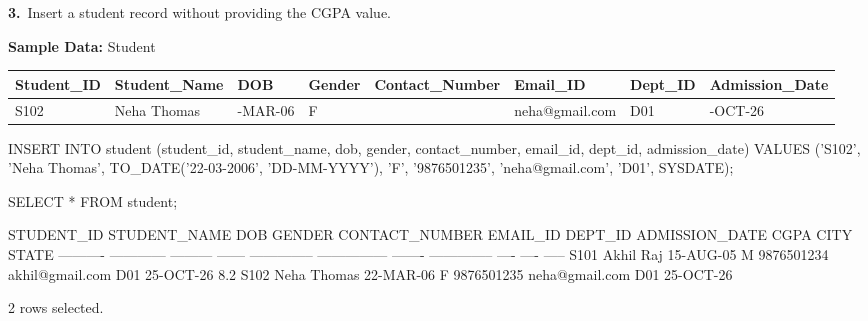 \noindent\begin{minipage}{\linewidth}
\begingroup{}
{\fontsize{14}{17}\selectfont\textbf{3.}}\ Insert a student record without providing the CGPA value.\par
\endgroup\vspace{12pt}

\noindent\textbf{Sample Data:} Student\par
\vspace{6pt}
{\scriptsize\setlength{\tabcolsep}{4pt}
\renewcommand{\arraystretch}{1.25}
\noindent\begin{tabular}{|>{\raggedright\arraybackslash}p{49.5pt}|>{\raggedright\arraybackslash}p{60.6pt}|>{\raggedright\arraybackslash}p{49.4pt}|>{\raggedright\arraybackslash}p{35.7pt}|>{\raggedright\arraybackslash}p{69.4pt}|>{\raggedright\arraybackslash}p{66.3pt}|>{\raggedright\arraybackslash}p{39.2pt}|>{\raggedright\arraybackslash}p{65.9pt}|}
\hline
\textbf{Student\_ID} & \textbf{Student\_Name} & \textbf{DOB} & \textbf{Gender} & \textbf{Contact\_Number} & \textbf{Email\_ID} & \textbf{Dept\_ID} & \textbf{Admission\_Date} \\ \hline
S102 & Neha Thomas & 22-MAR-06 & F & 9876501235 & neha@gmail.com & D01 & 25-OCT-26 \\ \hline
\end{tabular}\par}
\vspace{14pt}

\begin{sqlcode}
INSERT INTO student (student_id, student_name, dob, gender, contact_number,
                     email_id, dept_id, admission_date)
VALUES ('S102', 'Neha Thomas', TO_DATE('22-03-2006', 'DD-MM-YYYY'), 'F',
        '9876501235', 'neha@gmail.com', 'D01', SYSDATE);

SELECT * FROM student;
\end{sqlcode}

\vspace{18pt}


\begin{sqlout}[fontsize=\scriptsize]
STUDENT_ID STUDENT_NAME DOB       GENDER CONTACT_NUMBER EMAIL_ID        DEPT_ID ADMISSION_DATE CGPA CITY STATE
---------- ------------ --------- ------ -------------- --------------- ------- -------------- ---- ---- -----
S101       Akhil Raj    15-AUG-05 M      9876501234     akhil@gmail.com D01     25-OCT-26       8.2
S102       Neha Thomas  22-MAR-06 F      9876501235     neha@gmail.com  D01     25-OCT-26

2 rows selected.
\end{sqlout}
\end{minipage}\par\vspace{24pt}

